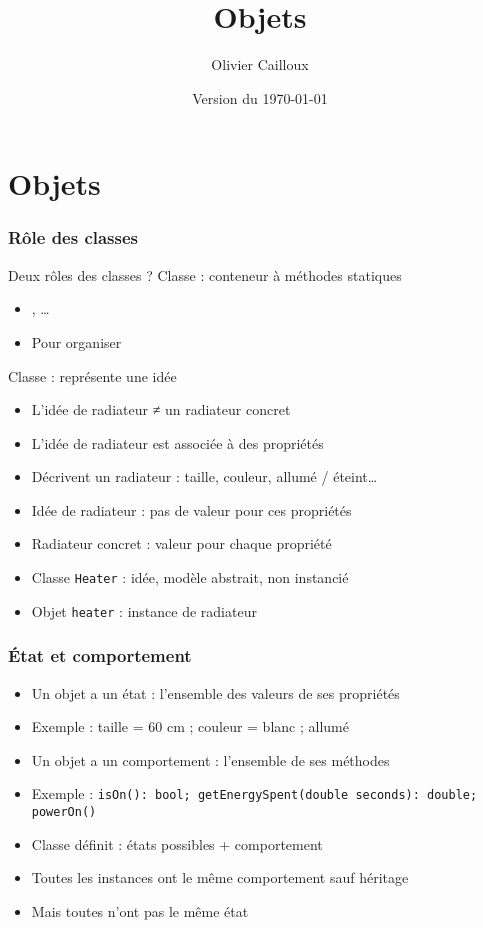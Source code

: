 \documentclass[english, french]{beamer}
\title{Objets}
\subtitle{}
\author{Olivier Cailloux}
\institute[LAMSADE]{LAMSADE, Université Paris-Dauphine}
\date{Version du \today}
\begin{document}


\begin{frame}[plain]
   \titlepage
\end{frame}
\addtocounter{framenumber}{-1}

\section{Objets}
\begin{frame}
	\frametitle{Rôle des classes}
	Deux rôles des classes ? \pause
	Classe : conteneur à méthodes statiques
	\begin{itemize}
		\item {}, …
		\item Pour organiser
	\end{itemize}
	Classe : représente une idée
	\begin{itemize}
		\item L’idée de radiateur ≠ un radiateur concret
		\item L’idée de radiateur est associée à des propriétés 
		\item Décrivent un radiateur : taille, couleur, allumé / éteint…
		\item Idée de radiateur : pas de valeur pour ces propriétés
		\item Radiateur concret : valeur pour chaque propriété
		\item Classe \texttt{Heater} : idée, modèle abstrait, non instancié
		\item Objet \texttt{heater} : instance de radiateur
	\end{itemize}
\end{frame}

\begin{frame}
	\frametitle{État et comportement}
	\begin{itemize}
		\item Un objet a un état : l’ensemble des valeurs de ses propriétés
		\item Exemple : {taille = 60 cm ; couleur = blanc ; allumé}
		\item Un objet a un comportement : l’ensemble de ses méthodes
		\item Exemple : \texttt{isOn(): bool; getEnergySpent(double seconds): double; powerOn()}
		\item Classe définit : états possibles + comportement
		\item Toutes les instances ont le même comportement {\tiny sauf héritage}
		\item Mais toutes n’ont pas le même état
	\end{itemize}
\end{frame}
\end{document}
